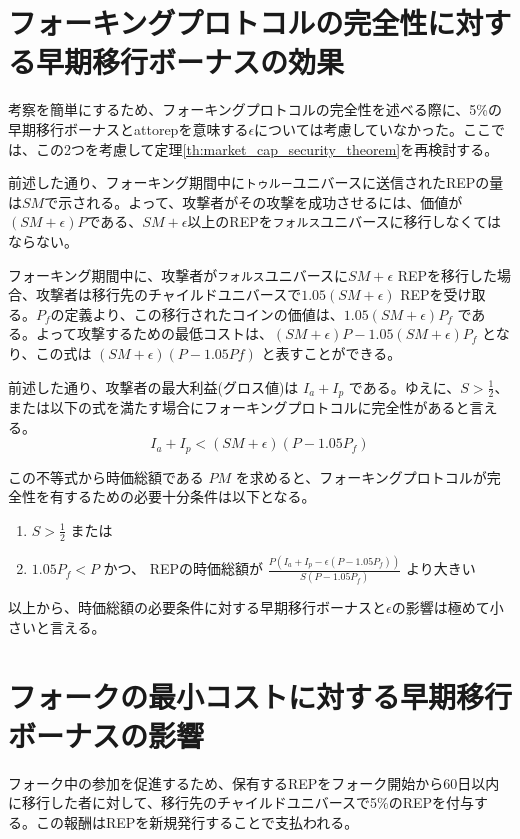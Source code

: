 \documentclass[floatfix,reprint,nofootinbib,amsmath,amssymb,epsfig,pre,floats,letterpaper,groupedaffiliation]{revtex4-1}
\newcommand{\beq}{\begin{equation}}
\newcommand{\eeq}{\end{equation}}
\theoremstyle{definition}
\theoremstyle{definition}
\theoremstyle{definition}
\begin{document}
\begin{appendix}
\section{フォーキングプロトコルの完全性に対する早期移行ボーナスの効果}\label{ap:early_migration_integrity}

考察を簡単にするため、フォーキングプロトコルの完全性を述べる際に、5\%の早期移行ボーナスとattorepを意味する$\epsilon$については考慮していなかった。ここでは、この2つを考慮して定理\ref{th:market_cap_security_theorem}を再検討する。

前述した通り、フォーキング期間中に\texttt{トゥルー}ユニバースに送信されたREPの量は$SM$で示される。よって、攻撃者がその攻撃を成功させるには、価値が$(SM+\epsilon)P$である、$SM+\epsilon$以上のREPを\texttt{フォルス}ユニバースに移行しなくてはならない。

フォーキング期間中に、攻撃者が\texttt{フォルス}ユニバースに$SM+\epsilon$ REPを移行した場合、攻撃者は移行先のチャイルドユニバースで$1.05(SM+\epsilon)$ REPを受け取る。$P_f$の定義より、この移行されたコインの価値は、$1.05(SM+\epsilon)P_f$ である。よって攻撃するための最低コストは、$(SM+\epsilon)P-1.05(SM+\epsilon)P_f$ となり、この式は $(SM+\epsilon)(P-1.05Pf)$ と表すことができる。

前述した通り、攻撃者の最大利益(グロス値)は $I_a + I_p$ である。ゆえに、$S > \frac{1}{2}$、または以下の式を満たす場合にフォーキングプロトコルに完全性があると言える。
\beq\label{eq:market_cap_security_requirement_detailed}
I_a + I_p < (SM+\epsilon)(P-1.05P_f)
\eeq

この不等式から時価総額である $PM$ を求めると、フォーキングプロトコルが完全性を有するための必要十分条件は以下となる。

\begin{enumerate}
\item{$S > \frac{1}{2}$ または}
\item{$1.05P_f < P$ かつ、 REPの時価総額が $\frac{P(I_a + I_p - \epsilon(P - 1.05P_f))}{S(P - 1.05P_f)}$ より大きい}
\end{enumerate}

以上から、時価総額の必要条件に対する早期移行ボーナスと$\epsilon$の影響は極めて小さいと言える。

\section{フォークの最小コストに対する早期移行ボーナスの影響}

フォーク中の参加を促進するため、保有するREPをフォーク開始から60日以内に移行した者に対して、移行先のチャイルドユニバースで5\%のREPを付与する。この報酬はREPを新規発行することで支払われる。


\end{appendix}
\end{document}
